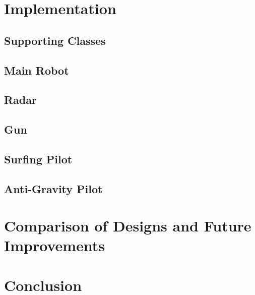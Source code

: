 \documentclass[11pt]{report}
\begin{document}
\chapter{Implementation} %
\section{Supporting Classes}
\section{Main Robot}
\section{Radar}
\section{Gun}
\section{Surfing Pilot}
\section{Anti-Gravity Pilot}

\chapter{Comparison of Designs and Future Improvements}

\chapter{Conclusion} %

\nocite{*}
\printbibliography
\end{document}
